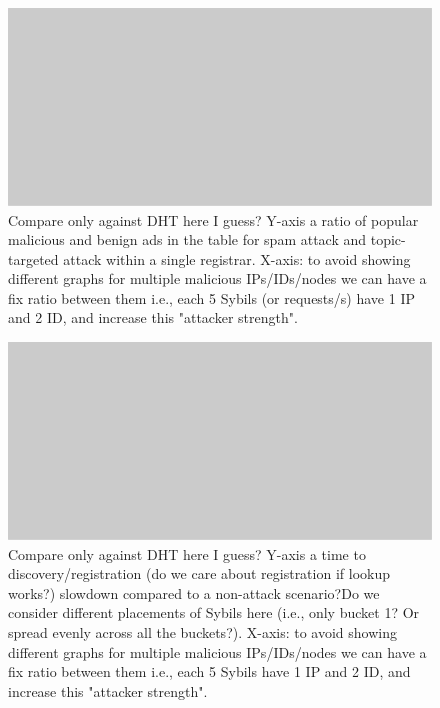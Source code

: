 \begin{figure}[!h]
\includegraphics[width=\linewidth]{img/placeholder}
\caption{Compare only against DHT here I guess? Y-axis a ratio of popular malicious and benign ads in the table for spam attack and topic-targeted attack within a single registrar. X-axis: to avoid showing different graphs for multiple malicious IPs/IDs/nodes we can have a fix ratio between them i.e., each 5 Sybils (or requests/s) have 1 IP and 2 ID, and increase this "attacker strength".} 
\label{fig:security_spam}
\end{figure}

\begin{figure}[!h]
\includegraphics[width=\linewidth]{img/placeholder}
\caption{Compare only against DHT here I guess? Y-axis a  time to discovery/registration (do we care about registration if lookup works?) slowdown compared to a non-attack scenario?Do we consider different placements of Sybils here (i.e., only bucket 1? Or spread evenly across all the buckets?). X-axis: to avoid showing different graphs for multiple malicious IPs/IDs/nodes we can have a fix ratio between them i.e., each 5 Sybils have 1 IP and 2 ID, and increase this "attacker strength".} 
\label{fig:security_spam}
\end{figure}



